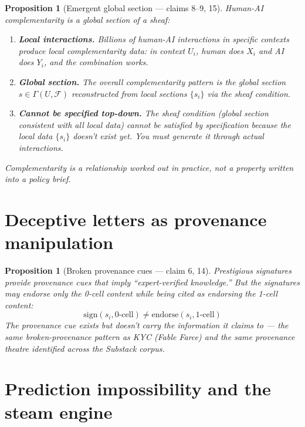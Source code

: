 \documentclass[11pt,a4paper]{article}
\newtheorem{proposition}[definition]{Proposition}
\begin{document}
\begin{proposition}[Emergent global section --- claims 8--9, 15]
\label{prop:sheaf}
Human-AI complementarity is a global section of a sheaf:
\begin{enumerate}
  \item \textbf{Local interactions.} Billions of human-AI interactions in
    specific contexts produce local complementarity data: in context $U_i$,
    human does $X_i$ and AI does $Y_i$, and the combination works.
  \item \textbf{Global section.} The overall complementarity pattern is
    the global section $s \in \Gamma(U, \mathcal{F})$ reconstructed from
    local sections $\{s_i\}$ via the sheaf condition.
  \item \textbf{Cannot be specified top-down.} The sheaf condition
    (global section consistent with all local data) cannot be satisfied
    by specification because the local data $\{s_i\}$ doesn't exist yet.
    You must generate it through actual interactions.
\end{enumerate}
Complementarity is a relationship worked out in practice, not a property
written into a policy brief.
\end{proposition}

\section{Deceptive letters as provenance manipulation}

\begin{proposition}[Broken provenance cues --- claim 6, 14]
\label{prop:provenance}
Prestigious signatures provide provenance cues that imply ``expert-verified
knowledge.'' But the signatures may endorse only the 0-cell content
while being cited as endorsing the 1-cell content:
\[
  \text{sign}(s_i, \text{0-cell}) \neq \text{endorse}(s_i, \text{1-cell})
\]
The provenance cue exists but doesn't carry the information it claims to
--- the same broken-provenance pattern as KYC (Fable Farce) and the same
provenance theatre identified across the Substack corpus.
\end{proposition}


\section{Prediction impossibility and the steam engine}
\label{sec:prediction}
\end{document}
